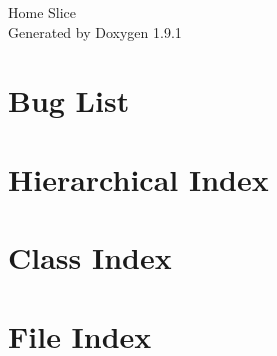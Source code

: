 \let\mypdfximage\pdfximage\def\pdfximage{\immediate\mypdfximage}\documentclass[twoside]{book}
\newcommand{\+}{\discretionary{\mbox{\scriptsize$\hookleftarrow$}}{}{}}
\newcommand{\clearemptydoublepage}{%
  \newpage{\pagestyle{empty}\cleardoublepage}%
}
\begin{document}
\raggedbottom

\hypersetup{pageanchor=false,
             bookmarksnumbered=true,
             pdfencoding=unicode
            }
\begin{titlepage}
\vspace*{7cm}
\begin{center}%
{\Large Home Slice }\\
\vspace*{1cm}
{\large Generated by Doxygen 1.9.1}\\
\end{center}
\end{titlepage}
\clearemptydoublepage
{}
\tableofcontents
\clearemptydoublepage
{}
\hypersetup{pageanchor=true}

\chapter{Bug List}
\label{bug}

\chapter{Hierarchical Index}

\chapter{Class Index}

\chapter{File Index}

\end{document}
